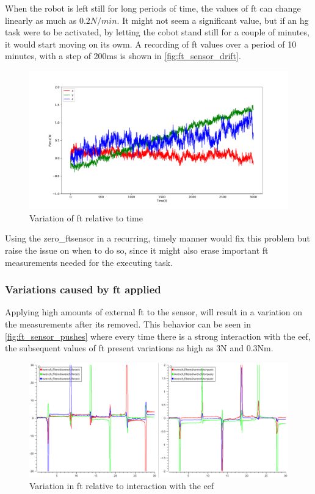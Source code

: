 \par When the robot is left still for long periods of time, the values of \ac{ft} can change linearly as much as $0.2\si{N}/\si{min}$. It might not seem a significant value, but if an \ac{hg} task were to be activated, by letting the cobot stand still for a couple of minutes, it would start moving on its owm. A recording of \ac{ft} values over a period of 10 minutes, with a step of 200ms is shown in \autoref{fig:ft_sensor_drift}. 

\begin{figure}[h]
    \centering
    \includegraphics[width=\linewidth]{figs/chp3/ft_sensor_drift.pdf}
    \caption{Variation of \ac{ft} relative to time}
    \label{fig:ft_sensor_drift}
\end{figure}

\par Using the zero\_ftsensor in a recurring, timely manner would fix this problem but raise the issue on when to do so, since it might also erase important \ac{ft} measurements needed for the executing task.

\subsubsection{Variations caused by \ac{ft} applied}

\par Applying high amounts of external \ac{ft} to the sensor, will result in a variation on the measurements after its removed. This behavior can be seen in \autoref{fig:ft_sensor_pushes} where every time there is a strong interaction with the \ac{eef}, the subsequent values of \ac{ft} present variations as high as 3N and 0.3Nm.

\begin{figure}[h]
    \centering
    \includegraphics[width=0.9\linewidth]{figs/chp3/ft_sensor_pushes.png}
    \caption{Variation in \ac{ft} relative to interaction with the \ac{eef}}
    \label{fig:ft_sensor_pushes}
\end{figure}

